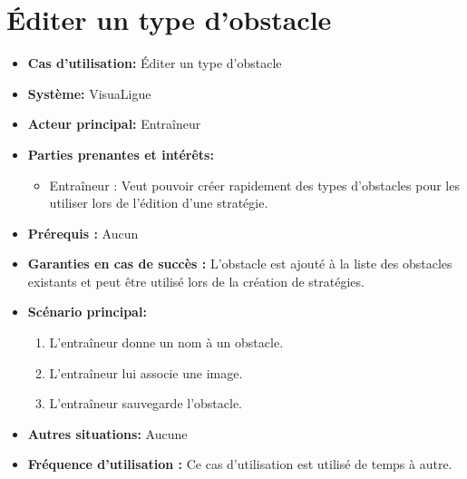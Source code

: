 \section{Éditer un type d'obstacle}
\label{sec:editer_un_type_d_obstacle}

\begin{itemize}
    \item \textbf{Cas d'utilisation:} \'Editer un type d'obstacle
    \item \textbf{Syst\`eme:} VisuaLigue
    \item \textbf{Acteur principal:} Entra\^ineur
    \item \textbf{Parties prenantes et int\'er\^ets:}
    	\begin{itemize}
    		\item Entra\^ineur : Veut pouvoir cr\'eer rapidement des types d'obstacles pour les utiliser lors de l'\'edition d'une strat\'egie.
    	\end{itemize}
    \item \textbf{Pr\'erequis :} Aucun
    \item \textbf{Garanties en cas de succ\`es :} L'obstacle est ajout\'e \`a la liste des obstacles existants et peut \^etre utilis\'e lors de la cr\'eation de strat\'egies.
    \item \textbf{Sc\'enario principal:}
        \begin{enumerate}
            \item L'entra\^ineur donne un nom \`a un obstacle.
            \item L'entra\^ineur lui associe une image.
            \item L'entra\^ineur sauvegarde l'obstacle.
        \end{enumerate}
    \item \textbf{Autres situations:} Aucune
    \item \textbf{Fréquence d'utilisation :} Ce cas d'utilisation est utilis\'e de temps \`a autre.
\end{itemize}



